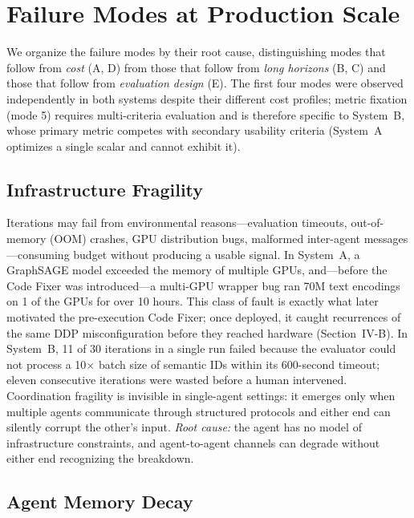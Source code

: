 \documentclass[conference]{IEEEtran}
\begin{document}
\section{Failure Modes at Production Scale}

We organize the failure modes by their root cause, distinguishing modes that follow from \textit{cost} (A, D) from those that follow from \textit{long horizons} (B, C) and those that follow from \textit{evaluation design} (E). The first four modes were observed independently in both systems despite their different cost profiles; metric fixation (mode 5) requires multi-criteria evaluation and is therefore specific to System~B, whose primary metric competes with secondary usability criteria (System~A optimizes a single scalar and cannot exhibit it).

\subsection{Infrastructure Fragility}

Iterations may fail from environmental reasons---evaluation timeouts, out-of-memory (OOM) crashes, GPU distribution bugs, malformed inter-agent messages---consuming budget without producing a usable signal. In System~A, a GraphSAGE model exceeded the memory of multiple GPUs, and---before the Code Fixer was introduced---a multi-GPU wrapper bug ran 70M text encodings on 1 of the GPUs for over 10 hours. This class of fault is exactly what later motivated the pre-execution Code Fixer; once deployed, it caught recurrences of the same DDP misconfiguration before they reached hardware (Section~IV-B). In System~B, 11 of 30 iterations in a single run failed because the evaluator could not process a 10$\times$ batch size of semantic IDs within its 600-second timeout; eleven consecutive iterations were wasted before a human intervened. Coordination fragility is invisible in single-agent settings: it emerges only when multiple agents communicate through structured protocols and either end can silently corrupt the other's input. \textit{Root cause:} the agent has no model of infrastructure constraints, and agent-to-agent channels can degrade without either end recognizing the breakdown.

\subsection{Agent Memory Decay}
\end{document}
